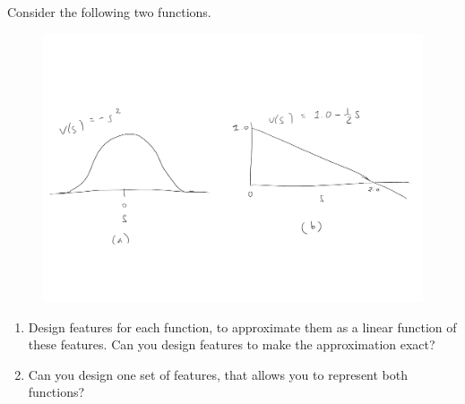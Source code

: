 Consider the following two functions.
%
\begin{figure}[h!]
  \center
  \includegraphics[width=0.75\linewidth]{figures/simplefcns.pdf}
\end{figure}
%
\begin{enumerate}
\item Design features for each function, to approximate them as a linear function of these features. Can you design features to make the approximation exact?
\item Can you design one set of features, that allows you to represent both functions?
\end{enumerate}
